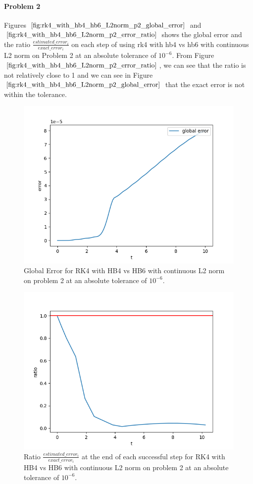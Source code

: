 \paragraph{Problem 2} Figures $\ref{fig:rk4_with_hb4_hb6_L2norm_p2_global_error}$ and $\ref{fig:rk4_with_hb4_hb6_L2norm_p2_error_ratio}$ shows the global error and the ratio $\frac{estimated\_error_i}{exact\_error_i}$ on each step of using rk4 with hb4 vs hb6 with continuous L2 norm on Problem 2 at an absolute tolerance of $10^{-6}$. From Figure $\ref{fig:rk4_with_hb4_hb6_L2norm_p2_error_ratio}$, we can see that the ratio is not relatively close to 1 and we can see in Figure $\ref{fig:rk4_with_hb4_hb6_L2norm_p2_global_error}$ that the exact error is not within the tolerance.

\begin{figure}[H]
\centering
\includegraphics[width=0.7\linewidth]{./figures/rk4_with_hb4_hb6_L2norm_p2_global_error}
\caption{Global Error for RK4 with HB4 vs HB6 with continuous L2 norm on problem 2 at an absolute tolerance of $10^{-6}$.}
\label{fig:rk4_with_hb4_hb6_L2norm_p2_global_error}
\end{figure}

\begin{figure}[H]
\centering
\includegraphics[width=0.7\linewidth]{./figures/rk4_with_hb4_hb6_L2norm_p2_error_ratio}
\caption{Ratio $\frac{estimated\_error_i}{exact\_error_i}$ at the end of each successful step for RK4 with HB4 vs HB6 with continuous L2 norm on problem 2 at an absolute tolerance of $10^{-6}$.}
\label{fig:rk4_with_hb4_hb6_L2norm_p2_error_ratio}
\end{figure}

